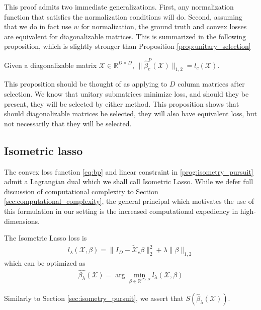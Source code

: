 This proof admits two immediate generalizations.
First, any normalization function that satisfies the normalization conditions will do.
Second, assuming that we do in fact use $w$ for normalization, the ground truth and convex losses are equivalent for diagonalizable matrices.
This is summarized in the following proposition, which is slightly stronger than Proposition \ref{prop:unitary_selection}
 \begin{proposition}
 Given a diagonalizable matrix $\mathcal X \in \mathbb R^{D \times D}$, $\|\widehat \beta_c^P(\mathcal X)\|_{1,2} = l_c (\mathcal X)$.
 \end{proposition}
This proposition should be thought of as applying to $D$ column matrices after selection.
We know that unitary submatrices minimize loss, and should they be present, they will be selected by either method. %
This proposition shows that should diagonalizable matrices be selected, they will also have equivalent loss, but not necessarily that they will be selected.

\subsection{Isometric lasso}

The convex loss function \ref{eq:bp} and linear constraint in \ref{prog:isometry_pursuit} admit a Lagrangian dual which we shall call Isometric Lasso.
While we defer full discussion of computational complexity to Section \ref{sec:computational_complexity}, the general principal which motivates the use of this formulation in our setting is the increased computational expediency in high-dimensions.

The Isometric Lasso loss is
\begin{align}
l_\lambda (\mathcal X, \beta) =  \|I_D -  \tilde{ \mathcal X}_c \beta\|_2^2 +  \lambda \| \beta \|_{1,2}
\end{align}
which can be optimized as
\begin{align}
\label{prog:isometric_lasso}
\hat {\beta_{\lambda}} (\mathcal X) = \arg \min_{\beta \in \mathbb R^{P \times D}} l_\lambda (\mathcal X, \beta)
\end{align}

Similarly to Section \ref{sec:isometry_pursuit}, we assert that $S(\widehat {\beta}_{\lambda} (\mathcal X))$.

